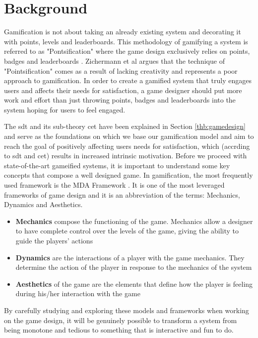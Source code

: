 \section{Background}
\label{game:background}
Gamification is not about taking an already existing system and decorating it with points, levels and leaderboards. This methodology of gamifying a system is referred to as "Pontsification" where the game design exclusively relies on points, badges and leaderboards \cite{47}. Zichermann et al \cite{48} argues that the technique of "Pointsification" comes as a result of lacking creativity and represents a poor approach to gamification. In order to create a gamified system that truly engages users and affects their needs for satisfaction, a game designer should put more work and effort than just throwing points, badges and leaderboards into the system hoping for users to feel engaged. 

The \ac{sdt} and its sub-theory \ac{cet} have been explained in Section \ref{thb:gamedesign} and serve as the foundations on which we base our gamification model and aim to reach the goal of positively affecting users needs for satisfaction, which (accrding to \ac{sdt} and \ac{cet}) results in increased intrinsic motivation. Before we proceed with state-of-the-art gameified systems, it is important to understand some key concepts that compose a well designed game. In gamification, the most frequently used framework is the MDA Framework \cite{47}. It is one of the most leveraged frameworks of game design and it is an abbreviation of the terms: Mechanics, Dynamics and Aesthetics.
\begin{itemize}
    \item \textbf{Mechanics} compose the functioning of the game. Mechanics allow a designer to have complete control over the levels of the game, giving the ability to guide the players' actions
    \item \textbf{Dynamics} are the interactions of a player with the game mechanics. They determine the action of the player in response to the mechanics of the system
    \item \textbf{Aesthetics} of the game are the elements that define how the player is feeling during his/her interaction with the game
\end{itemize}
 
By carefully studying and exploring these models and frameworks when working on the game design, it will be genuinely possible to transform a system from being monotone and tedious to something that is interactive and fun to do. 

